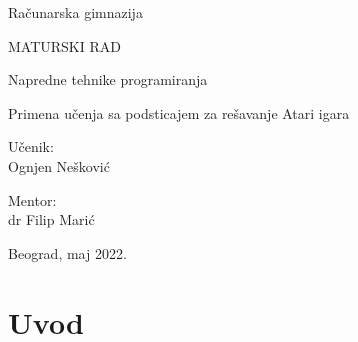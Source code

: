 \documentclass[a4paper,fleqn,12pt]{JMThesis}
\renewcommand{\ch}{\v c}
\renewcommand{\sh}{\v s}
\theoremstyle{plain}
\theoremstyle{definition}
\theoremstyle{definition}
\begin{document}
\begin{titlepage}
	
\begin{center}
	{\LARGE Ra\ch unarska gimnazija}
	\end{center}
	\vspace*{50mm}
	
	\begin{center}
	{\huge MATURSKI RAD}
	
	\vspace*{8pt}
	{\Large Napredne tehnike programiranja}
	\end{center}
	
	\vspace*{10pt}
	\begin{center}
	{\LARGE Primena u\ch enja sa podsticajem za re\sh avanje Atari igara}
	\end{center}
	
	\vspace*{70mm}
	\setlength{\columnsep}{50pt}
	\begin{multicols}{2}
	 {\noindent \Large Učenik:
	\\Ognjen Ne\sh ković}
	
	
	{ \noindent \hfill \Large Mentor:\\
	\hfill \phantom{aaaaaaaaa}  dr Filip Marić}
	\end{multicols}
	
	\vfill
	\begin{center}
	{\Large Beograd, maj 2022.}
	\end{center}
\end{titlepage}

\tableofcontents
\clearpage
{}
\renewcommand{\chaptername}{}
\setcounter{page}{1}

\chapter[Uvod]{Uvod}
\thispagestyle{plain}
\end{document}
